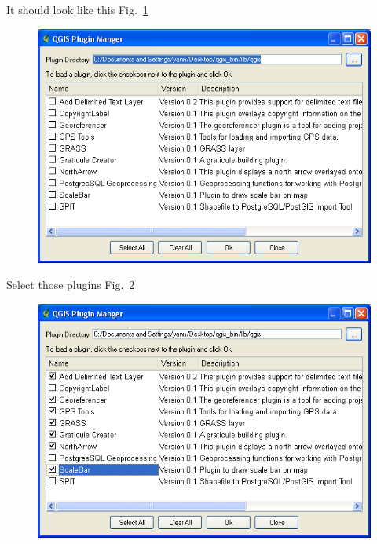 It should look like this Fig.~\ref{fig:qgis009}

\begin{figure}[htbp]
   \centering
   \includegraphics[scale=0.35]{qgis009.png}
   \caption{}
   \label{fig:qgis009}
\end{figure}

Select those plugins Fig.~\ref{fig:qgis010}

\begin{figure}[htbp]
   \centering
   \includegraphics[scale=0.35]{qgis010.png}
   \caption{}
   \label{fig:qgis010}
\end{figure}


